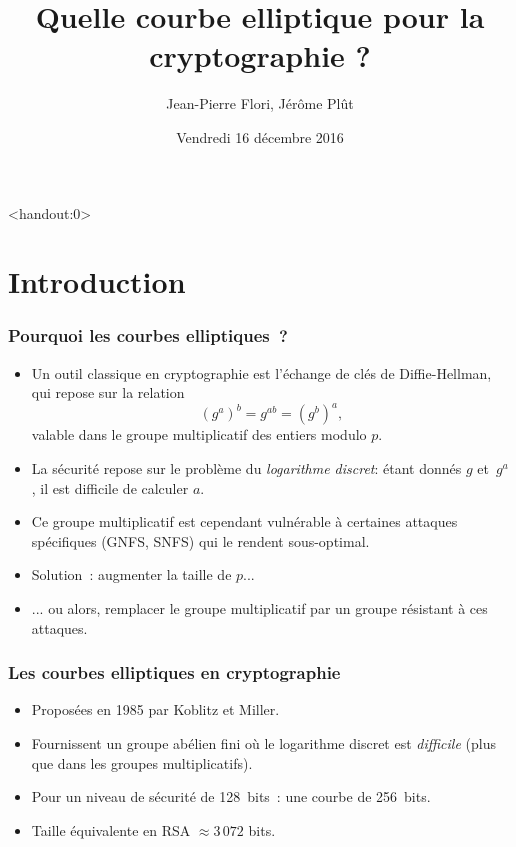 \documentclass[francais]{beamer}
\begin{document}
\title[Quelle courbe elliptique ?]{Quelle courbe elliptique pour la cryptographie ?}
\author[J.-P. Flori]{Jean-Pierre Flori, Jérôme Plût}
\date[16/12/2016]{Vendredi 16 décembre 2016}

\begin{frame}<handout:0> \titlepage
\end{frame}

\section{Introduction}

\begin{frame}\frametitle{Pourquoi les courbes elliptiques ?}
\begin{itemize}
\item Un outil classique en cryptographie est
l'échange de clés de Diffie-Hellman, qui repose sur la relation
\[ (g^a)^b = g^{ab} = (g^b)^a, \]
valable dans le groupe multiplicatif des entiers modulo $p$.
\item La sécurité repose sur le problème du \emph{logarithme discret}:
étant donnés $g$ et~$g^a$, il est difficile de calculer $a$.
\item Ce groupe multiplicatif est cependant vulnérable
à certaines attaques spécifiques (GNFS, SNFS)
qui le rendent sous-optimal.
\item Solution : augmenter la taille de $p$...
\item ... ou alors, remplacer le groupe multiplicatif
par un groupe résistant à ces attaques.
\end{itemize}
\end{frame}

\begin{frame}\frametitle{Les courbes elliptiques en cryptographie}
\begin{itemize}
\item Proposées en 1985 par Koblitz et Miller.
\item Fournissent un groupe abélien fini
où le logarithme discret est \emph{difficile}
(plus que dans les groupes multiplicatifs).
\end{itemize}
\begin{example}
\begin{itemize}
\item Pour un niveau de sécurité de 128~bits : une courbe de 256~bits.
\item Taille équivalente en RSA $≈ 3\,072$ bits.
\end{itemize}
\end{example}
\end{frame}
\end{document}
